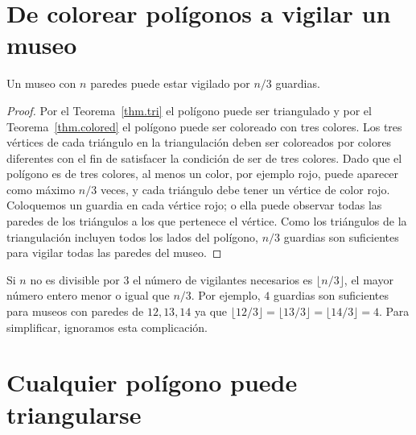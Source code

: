 \section{De colorear polígonos a vigilar un museo}\label{s.museum-guard}

\begin{theorem}\label{thm.guarded}
Un museo con $n$ paredes puede estar vigilado por $n/3$ guardias.
\end{theorem}
\begin{proof}
Por el Teorema~\ref{thm.tri} el polígono puede ser triangulado y por el Teorema~\ref{thm.colored} el polígono puede ser coloreado con tres colores. Los tres vértices de cada triángulo en la triangulación deben ser coloreados por colores diferentes con el fin de satisfacer la condición de ser de tres colores. Dado que el polígono es de tres colores, al menos un color, por ejemplo rojo, puede aparecer como máximo $n/3$ veces, y cada triángulo debe tener un vértice de color rojo. Coloquemos un guardia en cada vértice rojo; o ella puede observar todas las paredes de los triángulos a los que pertenece el vértice. Como los triángulos de la triangulación incluyen todos los lados del polígono, $n/3$ guardias son suficientes para vigilar todas las paredes del museo.
\end{proof}
Si $n$ no es divisible por $3$ el número de vigilantes necesarios es $\lfloor n/3\rfloor$, el mayor número entero menor o igual que $n/3$. Por ejemplo, $4$ guardias son suficientes para museos con paredes de $12, 13, 14$ ya que $\lfloor 12/3\rfloor =\lfloor 13/3\rfloor=\lfloor 14/3\rfloor=4$. Para simplificar, ignoramos esta complicación.
 
\section{Cualquier polígono puede triangularse}\label{s.museum-triangulated}

